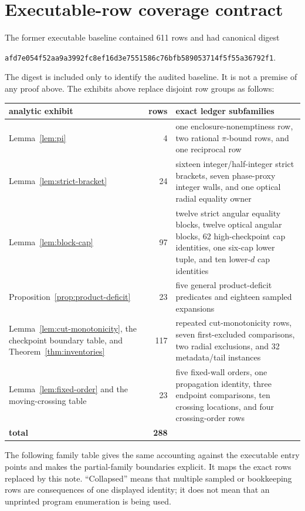 \documentclass[11pt]{article}
\theoremstyle{definition}
\theoremstyle{remark}
\begin{document}
\section{Executable-row coverage contract}
\label{sec:coverage}

The former executable baseline contained 611 rows and had canonical digest
\begin{center}
\texttt{afd7e054f52aa9a3992fc8ef16d3e7551586c76bfb589053714f5f55a36792f1}.
\end{center}
The digest is included only to identify the audited baseline.  It is not a
premise of any proof above.  The exhibits above replace disjoint row groups
as follows:
\begin{center}
\small
\renewcommand{\arraystretch}{1.16}
\begin{tabularx}{\textwidth}{@{}p{}|r|>{\raggedright\arraybackslash}X@{}}
analytic exhibit&rows&exact ledger subfamilies\\ \hline
Lemma~\ref{lem:pi}&4&one enclosure-nonemptiness row, two rational
\(\pi\)-bound rows, and one reciprocal row\\
Lemma~\ref{lem:strict-bracket}&24&sixteen integer/half-integer strict
brackets, seven phase-proxy integer walls, and one optical radial equality
owner\\
Lemma~\ref{lem:block-cap}&97&twelve strict angular equality blocks, twelve
optical angular blocks, 62 high-checkpoint cap identities, one six-cap lower
tuple, and ten lower-\(d\) cap identities\\
Proposition~\ref{prop:product-deficit}&23&five general product-deficit
predicates and eighteen sampled expansions\\
Lemma~\ref{lem:cut-monotonicity}, the checkpoint boundary table, and
Theorem~\ref{thm:inventories}&117&76 repeated cut-monotonicity rows, seven
first-excluded comparisons, two radial exclusions, and 32 metadata/tail
instances\\
Lemma~\ref{lem:fixed-order} and the moving-crossing table&23&five fixed-wall
orders, one propagation identity, three endpoint comparisons, ten crossing
locations, and four crossing-order rows\\ \hline
\textbf{total}&\textbf{288}&
\end{tabularx}
\end{center}

The following family table gives the same accounting against the executable
entry points and makes the partial-family boundaries explicit.  It maps the
exact rows
replaced by this note.  ``Collapsed'' means that multiple sampled or
bookkeeping rows are consequences of one displayed identity; it does not
mean that an unprinted program enumeration is being used.
\end{document}
